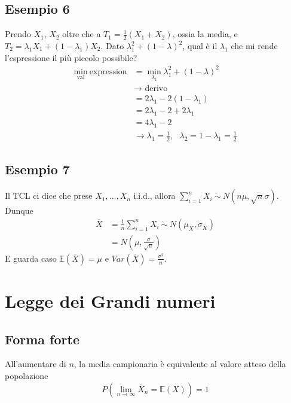 \documentclass[11pt]{report}
\begin{document}
\subsection{Esempio 6}
Prendo $X_1$, $X_2$ oltre che a $T_1 = \frac{1}{2}(X_1 + X_2)$, ossia la media, e $T_2 = \lambda_1 X_1 + (1 - \lambda_1)X_2$. Dato $\lambda_1^2 + (1-\lambda)^2$, qual è il $\lambda_1$ che mi rende l'espressione il più piccolo possibile?
\begin{equation}
    \begin{split}
        \min_{\text{val}}\ \text{expression} & = \min_{\lambda_1} \lambda_1^2 + (1-\lambda)^2\\
        & \rightarrow \text{ derivo}\\
        & = 2\lambda_1 - 2(1-\lambda_1)\\
        & = 2\lambda_1 - 2 + 2\lambda_1\\
        & = 4\lambda_1 - 2\\
        & \rightarrow \lambda_1=\frac{1}{2},\ \ \ \lambda_2 = 1-\lambda_1 = \frac{1}{2}
    \end{split}
\end{equation}

\subsection{Esempio 7}
Il TCL ci dice che prese $X_1, \dots, X_n$ i.i.d., allora $\sum_{i=1}^n X_i\ \dot\sim\ N \left( n\mu, \sqrt{n}\sigma \right)$. Dunque
\begin{equation}
	\begin{split}
		\overline{X} & = \frac{1}{n} \sum_{i=1}^n X_i\ \dot\sim\ N(\mu_{\overline{X}}, \sigma_{\overline{X}})\\
		& = N \left( \mu, \frac{\sigma}{\sqrt{n}} \right)
	\end{split}
\end{equation}
E guarda caso $\mathbb{E}(\overline{X}) = \mu$ e $Var(\overline{X}) = \frac{\sigma^2}{n}$.

\section{Legge dei Grandi numeri}

\subsection{Forma forte}
All'aumentare di $n$, la media campionaria è equivalente al valore atteso della popolazione
\begin{equation}
	P \left(\lim_{n\to\infty} \overline{X}_n = \mathbb{E}(X) \right) = 1
\end{equation}
\end{document}
